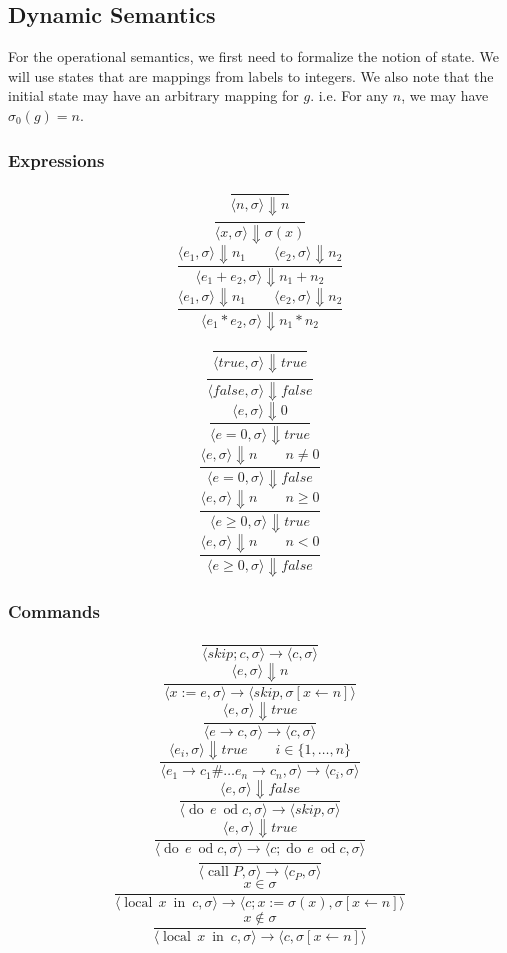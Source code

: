 \documentclass{article}
\newcommand{\dood}[1]{\operatorname{do}\, #1\ \operatorname{od}}
\newcommand{\callP}{\operatorname{call} P}
\newcommand{\localin}[2]{\operatorname{local}\, #1\ \operatorname{in}\ #2}
\begin{document}
\subsection{Dynamic Semantics}
\newcommand{\bigstep}[3]{\langle #1, #2 \rangle \Downarrow #3}
\newcommand{\smallstep}[4]{\langle #1, #2 \rangle \rightarrow \langle #3, #4 \rangle}

    For the operational semantics, we first need to formalize the notion of
    state.  We will use states that are mappings from labels to integers. We also note that the initial state may have an arbitrary mapping for $g$.  i.e. For any $n$, we may have $\sigma_0(g) = n$.
\subsubsection*{Expressions}
\[\frac{}
{\bigstep{n}{\sigma}{ n}}
\]
\[\frac{}
{\bigstep{x}{\sigma}{\sigma(x)}}
\]
\[\frac{\bigstep{e_1}{\sigma}{n_1} \qquad \bigstep{e_2}{\sigma}{n_2}}
{\bigstep{e_1 + e_2}{\sigma}{n_1 + n_2}}
\]
\[\frac{\bigstep{e_1}{\sigma}{n_1} \qquad \bigstep{e_2}{\sigma}{n_2}}
{\bigstep{e_1 * e_2}{\sigma}{n_1 * n_2}}
\]

\[\frac{}
{\bigstep{true}{\sigma}{true}}
\]
\[\frac{}
{\bigstep{false}{\sigma}{false}}
\]
\[\frac{\bigstep{e}{\sigma}{0}}
{\bigstep{e = 0}{\sigma}{ true }}
\]
\[\frac{\bigstep{e}{\sigma}{n} \qquad n \ne 0}
{\bigstep{e = 0}{\sigma}{false}}
\]
\[\frac{\bigstep{e}{\sigma}{n} \qquad n \ge 0}
{\bigstep{e \ge 0}{\sigma}{true}}
\]
\[\frac{\bigstep{e}{\sigma}{n} \qquad n < 0}
{\bigstep{e \ge 0}{\sigma}{false}}
\]


\subsubsection*{Commands}
\[\frac{}
{\smallstep{skip;c}{\sigma}{c}{\sigma}}
\]
\[\frac{\bigstep{e}{\sigma}{n}}
{\smallstep{x := e}{\sigma}{skip}{\sigma[x \gets n]}}
\]
\[\frac{\bigstep{e}{\sigma}{true}}
{\smallstep{e \rightarrow c}{\sigma}{c}{\sigma}}
\]
\[\frac{\bigstep{e_i}{\sigma}{true} \qquad i \in \{1,\dots,n\}}
{\smallstep{e_1 \rightarrow c_1 \# \dots e_n \rightarrow c_n}{\sigma}{c_i}{\sigma}}
\]
\[\frac{\bigstep{e}{\sigma}{false}}
{\smallstep{\dood{e}{c}}{\sigma}{skip}{\sigma}}
\]
\[\frac{\bigstep{e}{\sigma}{true}}
{\smallstep{\dood{e}{c}}{\sigma}{c;\dood{e}{c}}{\sigma}}
\]
\[\frac{}
{\smallstep{\callP}{\sigma}{c_P}{\sigma}}
\]
\[\frac{x \in \sigma}
{\smallstep{\localin{x}{c}}{\sigma}{c; x := \sigma(x) }{\sigma[x \gets n]}}
\]
\[\frac{x \not\in \sigma}
{\smallstep{\localin{x}{c}}{\sigma}{c}{\sigma[x \gets n]}}
\]
\end{document}
